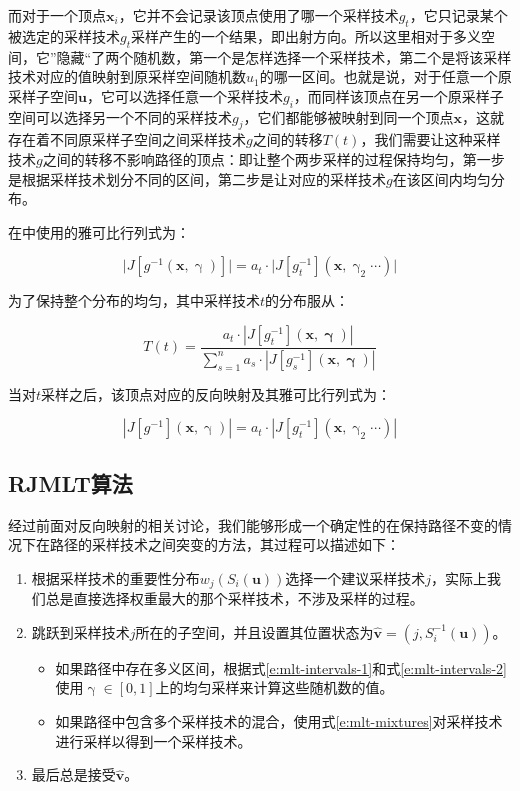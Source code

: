 而对于一个顶点$\mathbf{x}_i$，它并不会记录该顶点使用了哪一个采样技术$g_t$，它只记录某个被选定的采样技术$g_t$采样产生的一个结果，即出射方向。所以这里相对于多义空间，它”隐藏“了两个随机数，第一个是怎样选择一个采样技术，第二个是将该采样技术对应的值映射到原采样空间随机数$u_1$的哪一区间。也就是说，对于任意一个原采样子空间$\mathbf{u}$，它可以选择任意一个采样技术$g_i$，而同样该顶点在另一个原采样子空间可以选择另一个不同的采样技术$g_j$，它们都能够被映射到同一个顶点$\mathbf{x}$，这就存在着不同原采样子空间之间采样技术$g$之间的转移$T(t)$，我们需要让这种采样技术$g$之间的转移不影响路径的顶点：即让整个两步采样的过程保持均匀，第一步是根据采样技术划分不同的区间，第二步是让对应的采样技术$g$在该区间内均匀分布。

在\cite{a:ReversibleJumpMetropolisLightTransportusingInverseMappings}中使用的雅可比行列式为：

\begin{equation}
	\big|J[g^{-1}({\mathbf{x}},{\upgamma})]\big|=a_t\cdot\big|J[g^{-1}_t]({\mathbf{x}},{\upgamma}_2\cdots)\big|
\end{equation}

\noindent 为了保持整个分布的均匀，其中采样技术$t$的分布服从：

\begin{equation}\label{e:mlt-mixtures}
	T(t)=\frac{a_t\cdot|J[g^{-1}_t]({\mathbf{x}},{\mathbf{\upgamma}})|}{\sum^{n}_{s=1}a_s\cdot|J[g^{-1}_s]({\mathbf{x}},{\mathbf{\upgamma}})|}
\end{equation}

\noindent 当对$t$采样之后，该顶点对应的反向映射及其雅可比行列式为：

\begin{equation}
	|J[g^{-1}]({\mathbf{x}},{\upgamma})|=a_t\cdot|J[g^{-1}_t]({\mathbf{x}},\upgamma_2\cdots)|
\end{equation}




\subsection{RJMLT算法}
经过前面对反向映射的相关讨论，我们能够形成一个确定性的在保持路径不变的情况下在路径的采样技术之间突变的方法，其过程可以描述如下：

\begin{enumerate}
	\item 根据采样技术的重要性分布$w_j(S_i({\mathbf{u}}))$选择一个建议采样技术$j$，实际上我们总是直接选择权重最大的那个采样技术，不涉及采样的过程。
	\item 跳跃到采样技术$j$所在的子空间，并且设置其位置状态为$\hat{\mathbf{v}}=(j,S^{-1}_i({\mathbf{u}}))$。
	\begin{itemize}
		\item 如果路径中存在多义区间，根据式\ref{e:mlt-intervals-1}和式\ref{e:mlt-intervals-2}使用$\upgamma\in[0,1]$上的均匀采样来计算这些随机数的值。
		\item 如果路径中包含多个采样技术的混合，使用式\ref{e:mlt-mixtures}对采样技术进行采样以得到一个采样技术。
	\end{itemize}
	
	\item 最后总是接受$\hat{\mathbf{v}}$。
\end{enumerate}

